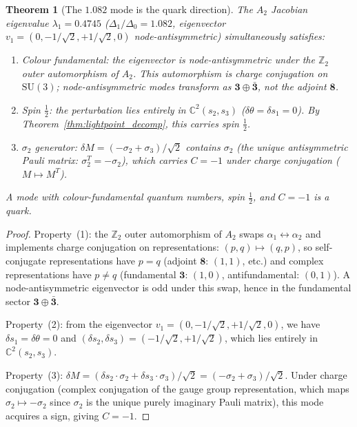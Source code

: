\documentclass[11pt,a4paper]{article}
\newtheorem{theorem}{Theorem}[section]
\theoremstyle{definition}
\theoremstyle{remark}
\newcommand{\C}{\mathbb{C}}
\newcommand{\Z}{\mathbb{Z}}
\newcommand{\SU}{\mathrm{SU}}
\begin{document}
\begin{theorem}[The $1.082$ mode is the quark direction]\label{thm:quark_mode}
The $A_2$ Jacobian eigenvalue $\lambda_1=0.4745$ ($\Delta_1/\Delta_0=1.082$, eigenvector $v_1=(0,-1/\sqrt{2},+1/\sqrt{2},0)$ node-antisymmetric) simultaneously satisfies:
\begin{enumerate}[nosep]
\item \emph{Colour fundamental}: the eigenvector is node-antisymmetric under the $\Z_2$ outer automorphism of $A_2$. This automorphism is charge conjugation on $\SU(3)$; node-antisymmetric modes transform as $\mathbf{3}\oplus\bar{\mathbf{3}}$, not the adjoint $\mathbf{8}$.
\item \emph{Spin $\tfrac{1}{2}$}: the perturbation lies entirely in $\C^2(s_2,s_3)$ ($\delta\theta=\delta s_1=0$). By Theorem~\ref{thm:lightpoint_decomp}, this carries spin $\tfrac{1}{2}$.
\item \emph{$\sigma_2$ generator}: $\delta M=(-\sigma_2+\sigma_3)/\sqrt{2}$ contains $\sigma_2$ (the unique antisymmetric Pauli matrix: $\sigma_2^T=-\sigma_2$), which carries $C=-1$ under charge conjugation ($M\mapsto M^T$).
\end{enumerate}
A mode with colour-fundamental quantum numbers, spin $\tfrac{1}{2}$, and $C=-1$ is a quark.
\end{theorem}

\begin{proof}
Property~(1): the $\Z_2$ outer automorphism of $A_2$ swaps $\alpha_1\leftrightarrow\alpha_2$ and implements charge conjugation on representations: $(p,q)\mapsto(q,p)$, so self-conjugate representations have $p=q$ (adjoint $\mathbf{8}$: $(1,1)$, etc.) and complex representations have $p\neq q$ (fundamental $\mathbf{3}$: $(1,0)$, antifundamental: $(0,1)$). A node-antisymmetric eigenvector is odd under this swap, hence in the fundamental sector $\mathbf{3}\oplus\bar{\mathbf{3}}$.

Property~(2): from the eigenvector $v_1=(0,-1/\sqrt{2},+1/\sqrt{2},0)$, we have $\delta s_1=\delta\theta=0$ and $(\delta s_2,\delta s_3)=(-1/\sqrt{2},+1/\sqrt{2})$, which lies entirely in $\C^2(s_2,s_3)$.

Property~(3): $\delta M=(\delta s_2\cdot\sigma_2+\delta s_3\cdot\sigma_3)/\sqrt{2}=(-\sigma_2+\sigma_3)/\sqrt{2}$. Under charge conjugation (complex conjugation of the gauge group representation, which maps $\sigma_2\mapsto-\sigma_2$ since $\sigma_2$ is the unique purely imaginary Pauli matrix), this mode acquires a sign, giving $C=-1$.
\end{proof}
\end{document}
